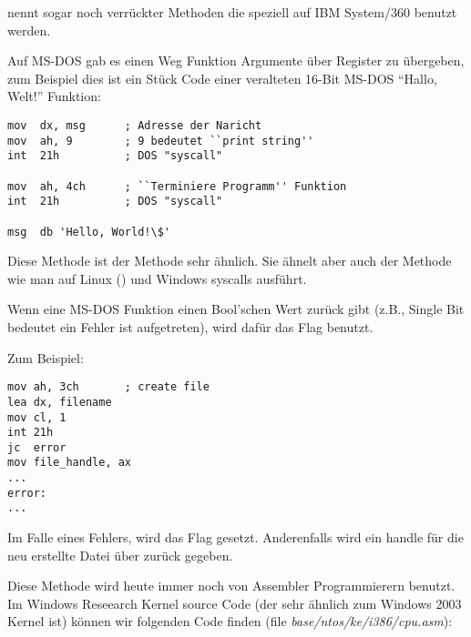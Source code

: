  nennt sogar noch verrückter Methoden die speziell auf IBM System/360 benutzt werden.


Auf MS-DOS gab es einen Weg Funktion Argumente über Register zu übergeben, zum Beispiel dies 
ist ein Stück Code einer veralteten 16-Bit MS-DOS ``Hallo, Welt!'' Funktion:

\begin{lstlisting}[style=customasmx86]
mov  dx, msg      ; Adresse der Naricht
mov  ah, 9        ; 9 bedeutet ``print string''
int  21h          ; DOS "syscall"

mov  ah, 4ch      ; ``Terminiere Programm'' Funktion
int  21h          ; DOS "syscall"

msg  db 'Hello, World!\$' 
\end{lstlisting}

Diese Methode ist der  Methode sehr ähnlich. Sie ähnelt aber auch der Methode
wie man auf Linux () und Windows syscalls ausführt.

Wenn eine MS-DOS Funktion einen Bool'schen Wert zurück gibt (z.B., Single Bit bedeutet ein Fehler ist aufgetreten), wird dafür das  Flag benutzt.

Zum Beispiel:

\begin{lstlisting}[style=customasmx86]
mov ah, 3ch       ; create file
lea dx, filename
mov cl, 1
int 21h
jc  error
mov file_handle, ax
...
error:
...
\end{lstlisting}

Im Falle eines Fehlers, wird das  Flag gesetzt. Anderenfalls wird ein handle für die neu erstellte Datei über  zurück gegeben. 


Diese Methode wird heute immer noch von Assembler Programmierern benutzt.
Im Windows Reseearch Kernel source Code (der sehr ähnlich zum Windows 2003 Kernel ist) können wir folgenden Code
finden (file \emph{base/ntos/ke/i386/cpu.asm}):

